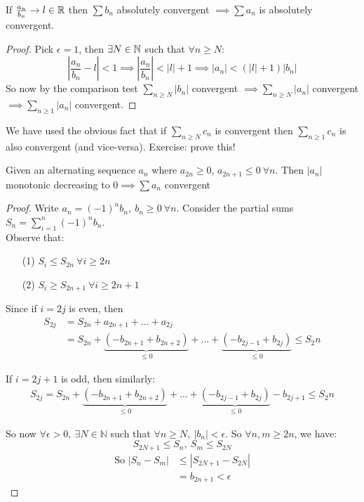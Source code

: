 \documentclass[twoside]{scrartcl}
\begin{document}
\begin{theorem}
If $\frac{a_n}{b_n}\to l \in \mathbb{R}$ then $\sum b_n$ absolutely convergent $\implies \sum a_n$ is absolutely convergent.
\end{theorem}
\begin{proof}
Pick $\epsilon = 1$, then $\exists N \in \mathbb{N}$ such that $\forall n \geq N$:
\[\left|\frac{a_n}{b_n} - l \right| < 1 \implies \left|\frac{a_n}{b_n}\right| < |l| + 1 \implies |a_n| < (|l| + 1)|b_n|\]
So now by the comparison test $\sum_{n \geq N} |b_n|$ convergent $\implies \sum_{n \geq N} |a_n|$ convergent $\implies \sum_{n\geq 1} |a_n|$ convergent. 	
\end{proof}

We have used the obvious fact that if $\sum_{n \geq N} c_n$ is convergent then $\sum_{n \geq 1} c_n$ is also convergent (and vice-versa). Exercise: prove this!\\

\begin{theorem}
Given an alternating sequence $a_n$ where $a_{2n} \geq 0$, $a_{2n+1} \leq 0~ \forall n$. Then $|a_n|$ monotonic decreasing to $0 \implies \sum a_n$ convergent
\end{theorem}

\begin{proof}
Write $a_n = (-1)^nb_n,~b_n\geq 0 ~\forall n	$. Consider the partial sums $S_n = \sum_{i=1}^{n} (-1)^nb_n$.\\

  Observe that: \begin{enumerate}
 \item[(1)]$S_i \leq S_{2n}~\forall i \geq 2n$
 \item[(2)]$S_i \geq S_{2n+1}~\forall i\geq 2n+1$
 \end{enumerate}
 Since if $i=2j$ is even, then
  \[\begin{aligned}
	S_{2j} &= S_{2n} + a_{2n+1} + \dots + a_{2j}\\ 
	&= S_{2n} + \underbrace{(-b_{2n+1} + b_{2n+2})}_{\leq 0} + \dots + \underbrace{(-b_{2j-1} + b_{2j})}_{\leq 0} \leq S_2n
\end{aligned}
\]
 
  If $i= 2j+1$ is odd, then similarly:
   \[\begin{aligned}
	S_{2j} = S_{2n} + \underbrace{(-b_{2n+1} + b_{2n+2})}_{\leq 0} + \dots + \underbrace{(-b_{2j-1} + b_{2j})}_{\leq 0} - b_{2j+1} \leq S_2n
\end{aligned}
\]
  
 So now $\forall \epsilon >0,~ \exists N \in \mathbb{N}$ such that $\forall n \geq N,~|b_n| < \epsilon$. So $\forall n,m\geq 2n$, we have: \[S_{2N+1} \leq S_n,~S_m \leq S_{2N}\] 
 \[\begin{aligned}\text{So } |S_n - S_m| &\leq |S_{2N+1} - S_{2N}|\\
 &= b_{2n+1} < \epsilon	
\end{aligned}
\]
\end{proof}\vspace*{5pt}
\end{document}
